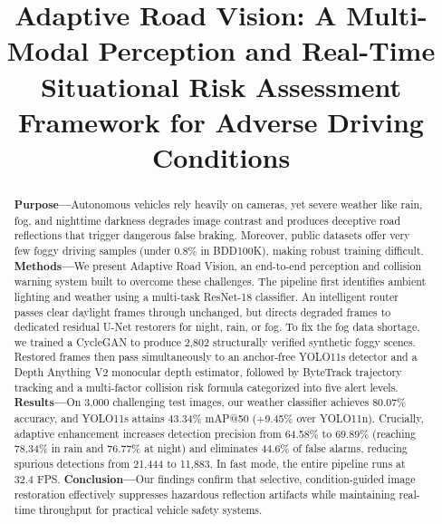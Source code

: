 \documentclass[conference]{IEEEtran}
\begin{document}
\title{Adaptive Road Vision: A Multi-Modal Perception and Real-Time Situational Risk Assessment Framework for Adverse Driving Conditions}

\author{
}

\maketitle

\begin{abstract}
\textbf{Purpose---}Autonomous vehicles rely heavily on cameras, yet severe weather like rain, fog, and nighttime darkness degrades image contrast and produces deceptive road reflections that trigger dangerous false braking. Moreover, public datasets offer very few foggy driving samples (under 0.8\% in BDD100K), making robust training difficult. \textbf{Methods---}We present Adaptive Road Vision, an end-to-end perception and collision warning system built to overcome these challenges. The pipeline first identifies ambient lighting and weather using a multi-task ResNet-18 classifier. An intelligent router passes clear daylight frames through unchanged, but directs degraded frames to dedicated residual U-Net restorers for night, rain, or fog. To fix the fog data shortage, we trained a CycleGAN to produce 2,802 structurally verified synthetic foggy scenes. Restored frames then pass simultaneously to an anchor-free YOLO11s detector and a Depth Anything V2 monocular depth estimator, followed by ByteTrack trajectory tracking and a multi-factor collision risk formula categorized into five alert levels. \textbf{Results---}On 3,000 challenging test images, our weather classifier achieves 80.07\% accuracy, and YOLO11s attains 43.34\% mAP@50 (+9.45\% over YOLO11n). Crucially, adaptive enhancement increases detection precision from 64.58\% to 69.89\% (reaching 78.34\% in rain and 76.77\% at night) and eliminates 44.6\% of false alarms, reducing spurious detections from 21,444 to 11,883. In fast mode, the entire pipeline runs at 32.4 FPS. \textbf{Conclusion---}Our findings confirm that selective, condition-guided image restoration effectively suppresses hazardous reflection artifacts while maintaining real-time throughput for practical vehicle safety systems.
\end{abstract}
\end{document}
